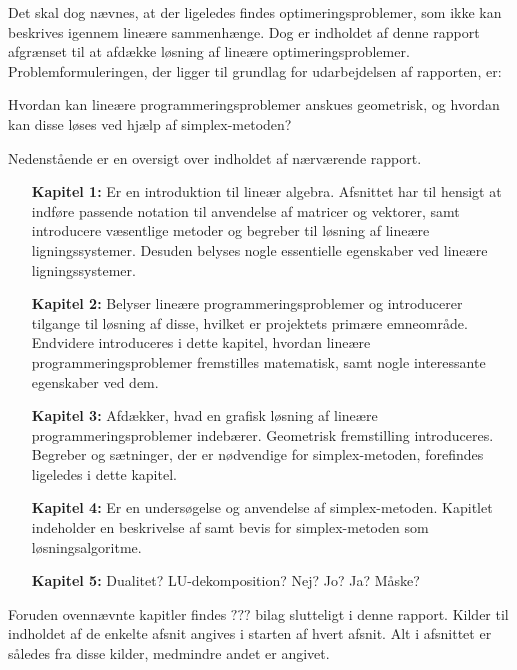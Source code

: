 Det skal dog nævnes, at der ligeledes findes optimeringsproblemer, som ikke kan beskrives igennem lineære sammenhænge. 
Dog er indholdet af denne rapport afgrænset til at afdække løsning af lineære optimeringsproblemer.
%
Problemformuleringen, der ligger til grundlag for udarbejdelsen af rapporten, er: 
%
\begin{col}{}{}
Hvordan kan lineære programmeringsproblemer anskues geometrisk, og hvordan kan disse løses ved hjælp af simplex-metoden?
\end{col}
% 
\noindent
%
Nedenstående er en oversigt over indholdet af nærværende rapport. 
\begin{itemize}[itemindent=4.6em]
\item[\textbf{Kapitel 1:}] Er en introduktion til lineær algebra.
Afsnittet har til hensigt at indføre passende notation til anvendelse af matricer og vektorer, samt introducere væsentlige metoder og begreber til løsning af lineære ligningssystemer. 
Desuden belyses nogle essentielle egenskaber ved lineære ligningssystemer. 
\item[\textbf{Kapitel 2:}] Belyser lineære programmeringsproblemer og introducerer tilgange til løsning af disse, hvilket er projektets primære emneområde. 
Endvidere introduceres i dette kapitel, hvordan lineære programmeringsproblemer fremstilles matematisk, samt nogle interessante egenskaber ved dem. 
\item[\textbf{Kapitel 3:}] Afdækker, hvad en grafisk løsning af lineære programmeringsproblemer indebærer. 
Geometrisk fremstilling introduceres. 
Begreber og sætninger, der er nødvendige for simplex-metoden, forefindes ligeledes i dette kapitel. 
\item[\textbf{Kapitel 4:}] Er en undersøgelse og anvendelse af simplex-metoden. 
Kapitlet indeholder en beskrivelse af samt bevis for simplex-metoden som løsningsalgoritme.
\item[\textbf{Kapitel 5:}] Dualitet? LU-dekomposition? Nej? Jo? Ja? Måske? 
\end{itemize}
%
Foruden ovennævnte kapitler findes $???$ bilag slutteligt i denne rapport.
Kilder til indholdet af de enkelte afsnit angives i starten af hvert afsnit. 
Alt i afsnittet er således fra disse kilder, medmindre andet er angivet. 